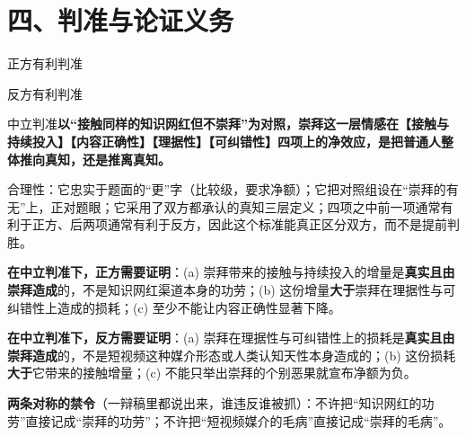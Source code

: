 \documentclass[prep,both]{debate}
\begin{document}
\section{四、判准与论证义务}
\begin{fields}
\begin{procard}{正方有利判准}\end{procard}
\begin{concard}{反方有利判准}\end{concard}
\begin{neutralcard}{中立判准}\textbf{以“接触同样的知识网红但不崇拜”为对照，崇拜这一层情感在【接触与持续投入】【内容正确性】【理据性】【可纠错性】四项上的净效应，是把普通人整体推向真知，还是推离真知。}\end{neutralcard}
\begin{bullets}
\item 合理性：它忠实于题面的“更”字（比较级，要求净额）；它把对照组设在“崇拜的有无”上，正对题眼；它采用了双方都承认的真知三层定义；四项之中前一项通常有利于正方、后两项通常有利于反方，因此这个标准能真正区分双方，而不是提前判胜。
\item \textbf{在中立判准下，正方需要证明}：(a) 崇拜带来的接触与持续投入的增量是\textbf{真实且由崇拜造成}的，不是知识网红渠道本身的功劳；(b) 这份增量\textbf{大于}崇拜在理据性与可纠错性上造成的损耗；(c) 至少不能让内容正确性显著下降。
\item \textbf{在中立判准下，反方需要证明}：(a) 崇拜在理据性与可纠错性上的损耗是\textbf{真实且由崇拜造成}的，不是短视频这种媒介形态或人类认知天性本身造成的；(b) 这份损耗\textbf{大于}它带来的接触增量；(c) 不能只举出崇拜的个别恶果就宣布净额为负。
\item \textbf{两条对称的禁令}（一辩稿里都说出来，谁违反谁被抓）：不许把“知识网红的功劳”直接记成“崇拜的功劳”；不许把“短视频媒介的毛病”直接记成“崇拜的毛病”。
\end{bullets}
\end{fields}
\end{document}
